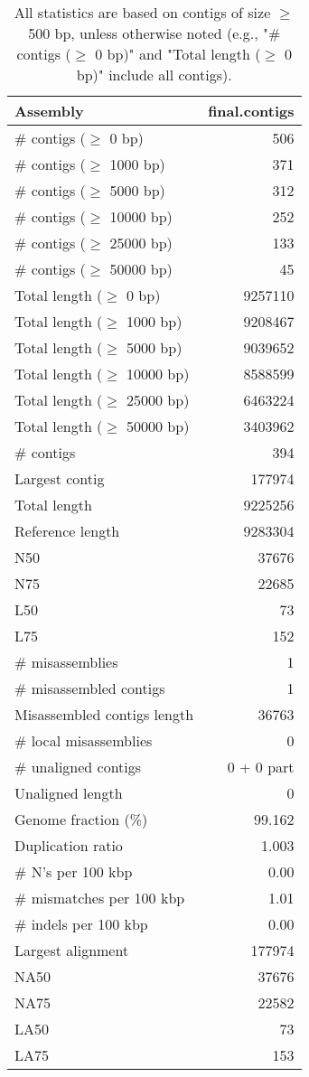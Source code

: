\documentclass[12pt,a4paper]{article}
\begin{document}
\begin{table}[ht]
\begin{center}
\caption{All statistics are based on contigs of size $\geq$ 500 bp, unless otherwise noted (e.g., "\# contigs ($\geq$ 0 bp)" and "Total length ($\geq$ 0 bp)" include all contigs).}
\begin{tabular}{|l*{1}{|r}|}
\hline
Assembly & final.contigs \\ \hline
\# contigs ($\geq$ 0 bp) & 506 \\ \hline
\# contigs ($\geq$ 1000 bp) & 371 \\ \hline
\# contigs ($\geq$ 5000 bp) & 312 \\ \hline
\# contigs ($\geq$ 10000 bp) & 252 \\ \hline
\# contigs ($\geq$ 25000 bp) & 133 \\ \hline
\# contigs ($\geq$ 50000 bp) & 45 \\ \hline
Total length ($\geq$ 0 bp) & 9257110 \\ \hline
Total length ($\geq$ 1000 bp) & 9208467 \\ \hline
Total length ($\geq$ 5000 bp) & 9039652 \\ \hline
Total length ($\geq$ 10000 bp) & 8588599 \\ \hline
Total length ($\geq$ 25000 bp) & 6463224 \\ \hline
Total length ($\geq$ 50000 bp) & 3403962 \\ \hline
\# contigs & 394 \\ \hline
Largest contig & 177974 \\ \hline
Total length & 9225256 \\ \hline
Reference length & 9283304 \\ \hline
N50 & 37676 \\ \hline
N75 & 22685 \\ \hline
L50 & 73 \\ \hline
L75 & 152 \\ \hline
\# misassemblies & 1 \\ \hline
\# misassembled contigs & 1 \\ \hline
Misassembled contigs length & 36763 \\ \hline
\# local misassemblies & 0 \\ \hline
\# unaligned contigs & 0 + 0 part \\ \hline
Unaligned length & 0 \\ \hline
Genome fraction (\%) & 99.162 \\ \hline
Duplication ratio & 1.003 \\ \hline
\# N's per 100 kbp & 0.00 \\ \hline
\# mismatches per 100 kbp & 1.01 \\ \hline
\# indels per 100 kbp & 0.00 \\ \hline
Largest alignment & 177974 \\ \hline
NA50 & 37676 \\ \hline
NA75 & 22582 \\ \hline
LA50 & 73 \\ \hline
LA75 & 153 \\ \hline
\end{tabular}
\end{center}
\end{table}
\end{document}
